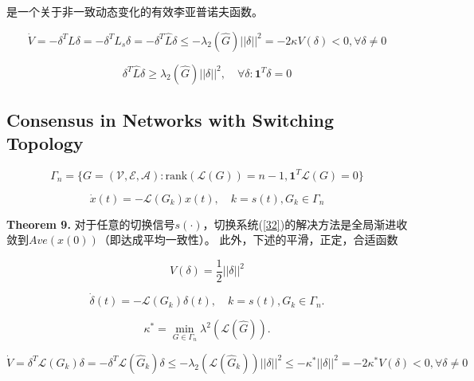 \documentclass{article}
\begin{document}
是一个关于非一致动态变化的有效李亚普诺夫函数。

\begin{equation}
    \tag{29}
    \label{29}
    \dot{V} = -\delta^TL\delta = -\delta^TL_s\delta = -\delta^T\hat{L}\delta \le -\lambda_2(\hat{G})||\delta||^2 = -2\kappa V(\delta) < 0, \forall \delta \ne 0
\end{equation}

\begin{equation}
    \tag{30}
    \label{30}
    \delta^T \hat{L} \delta \ge \lambda_2(\hat{G})||\delta||^2,\quad \forall\delta:\mathbf{1}^T\delta=0
\end{equation}

\subsection{Consensus in Networks with Switching Topology}

\begin{equation}
    \Gamma_n = \{ G=(\mathcal{V}, \mathcal{E}, \mathcal{A}): \text{rank}(\mathcal{L}(G)) =n-1, \mathbf{1}^T\mathcal{L}(G) = 0\}
    \tag{31}
    \label{31}
\end{equation}

\begin{equation}
    \dot{x}(t) = -\mathcal{L}(G_k)x(t),\quad k=s(t), G_k\in \Gamma_n
    \tag{32}
    \label{32}
\end{equation}

\noindent \textbf{Theorem 9.} 对于任意的切换信号$s(\cdot)$，切换系统(\ref{32})的解决方法是全局渐进收敛到$Ave(x(0))$（即达成平均一致性）。
此外，下述的平滑，正定，合适函数

\begin{equation}
    V(\delta) = \frac{1}{2}||\delta||^2
    \label{33}
    \tag{33}
\end{equation}

\begin{equation}
    \dot{\delta}(t) = -\mathcal{L}(G_k)\delta(t),\quad k=s(t),G_k\in \Gamma_n.
    \tag{34}
    \label{34}
\end{equation}

\begin{equation}
    \kappa^* = \min_{G\in \Gamma_n} \lambda^2(\mathcal{L}(\hat{G})).
    \tag{35}
    \label{35}
\end{equation}

\begin{equation}
    \tag{36}
    \label{36}
    \dot{V} = \delta^T\mathcal{L}(G_k)\delta = -\delta^T\mathcal{L}(\hat{G}_k)\delta \le -\lambda_2(\mathcal{L}(\hat{G}_k))||\delta||^2 \le -\kappa^*||\delta||^2 = -2\kappa^*V(\delta)<0,\forall \delta \ne 0
\end{equation}
\end{document}
